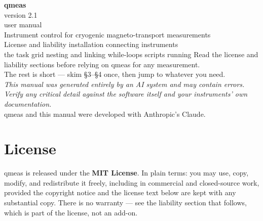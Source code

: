 \documentclass[11pt,a4paper]{article}
\begin{document}
\begin{titlepage}
\centering
\vspace*{3.2cm}
{\Huge\bfseries\color{qblue} qmeas}\\[6pt]
{\LARGE\color{qaccent} version 2.1}\\[10pt]
{\large user manual}\\[1.4cm]
{\normalsize\color{qgrey} Instrument control for cryogenic magneto-transport measurements}\\[2.5cm]
{\small\color{qgrey}
License and liability \textbullet{} installation \textbullet{} connecting instruments\\
the task grid \textbullet{} nesting and linking \textbullet{} while-loops \textbullet{} scripts \textbullet{} running}
\vfill
{\footnotesize\color{qgrey} Read the license and liability sections before relying on qmeas
for any measurement.\\ The rest is short --- skim \S3--\S4 once, then jump to whatever you need.}\\[1.4em]
{\footnotesize\itshape\color{qwarn} This manual was generated entirely by an AI system and may
contain errors.\\ Verify any critical detail against the software itself and your instruments'
own documentation.}\\[0.8em]
{\footnotesize\color{qgrey} qmeas and this manual were developed with Anthropic's Claude.}
\end{titlepage}

\tableofcontents
\newpage

\section{License}

qmeas is released under the \textbf{MIT License}. In plain terms: you may
use, copy, modify, and redistribute it freely, including in commercial and
closed-source work, provided the copyright notice and the license text below
are kept with any substantial copy. There is no warranty --- see the
liability section that follows, which is part of the license, not an
add-on.
\end{document}
